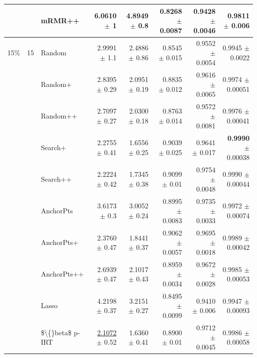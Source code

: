 \begin{longtable}{llp{}rrrrr}
 &  & mRMR++ & 6.0610 {\scriptsize $\pm$ 1} & 4.8949 {\scriptsize $\pm$ 0.8} & 0.8268 {\scriptsize $\pm$ 0.0087} & 0.9428 {\scriptsize $\pm$ 0.0046} & 0.9811 {\scriptsize $\pm$ 0.006} \\
\midrule
15\% & 15 & Random & 2.9991 {\scriptsize $\pm$ 1.1} & 2.4886 {\scriptsize $\pm$ 0.86} & 0.8545 {\scriptsize $\pm$ 0.015} & 0.9552 {\scriptsize $\pm$ 0.0054} & 0.9945 {\scriptsize $\pm$ 0.0022} \\
 &  & Random+ & 2.8395 {\scriptsize $\pm$ 0.29} & 2.0951 {\scriptsize $\pm$ 0.19} & 0.8835 {\scriptsize $\pm$ 0.012} & 0.9616 {\scriptsize $\pm$ 0.0065} & 0.9974 {\scriptsize $\pm$ 0.00051} \\
 &  & Random++ & 2.7097 {\scriptsize $\pm$ 0.27} & 2.0300 {\scriptsize $\pm$ 0.18} & 0.8763 {\scriptsize $\pm$ 0.014} & 0.9572 {\scriptsize $\pm$ 0.0081} & 0.9976 {\scriptsize $\pm$ 0.00041} \\
 &  & Search+ & 2.2755 {\scriptsize $\pm$ 0.41} & 1.6556 {\scriptsize $\pm$ 0.25} & 0.9039 {\scriptsize $\pm$ 0.025} & 0.9641 {\scriptsize $\pm$ 0.017} & \textbf{0.9990} {\scriptsize $\pm$ 0.00038} \\
 &  & Search++ & 2.2224 {\scriptsize $\pm$ 0.42} & 1.7345 {\scriptsize $\pm$ 0.38} & 0.9099 {\scriptsize $\pm$ 0.01} & 0.9754 {\scriptsize $\pm$ 0.0048} & 0.9990 {\scriptsize $\pm$ 0.00044} \\
 &  & AnchorPts & 3.6173 {\scriptsize $\pm$ 0.3} & 3.0052 {\scriptsize $\pm$ 0.24} & 0.8995 {\scriptsize $\pm$ 0.0083} & 0.9735 {\scriptsize $\pm$ 0.0033} & 0.9972 {\scriptsize $\pm$ 0.00074} \\
 &  & AnchorPts+ & 2.3760 {\scriptsize $\pm$ 0.47} & 1.8441 {\scriptsize $\pm$ 0.37} & 0.9062 {\scriptsize $\pm$ 0.0057} & 0.9695 {\scriptsize $\pm$ 0.0018} & 0.9989 {\scriptsize $\pm$ 0.00042} \\
 &  & AnchorPts++ & 2.6939 {\scriptsize $\pm$ 0.47} & 2.1017 {\scriptsize $\pm$ 0.43} & 0.8959 {\scriptsize $\pm$ 0.0034} & 0.9672 {\scriptsize $\pm$ 0.0028} & 0.9985 {\scriptsize $\pm$ 0.00053} \\
 &  & Lasso & 4.2198 {\scriptsize $\pm$ 0.37} & 3.2151 {\scriptsize $\pm$ 0.27} & 0.8495 {\scriptsize $\pm$ 0.0099} & 0.9410 {\scriptsize $\pm$ 0.006} & 0.9947 {\scriptsize $\pm$ 0.00093} \\
 &  & \$\textbackslash\{\}beta\$ p-IRT & \underline{2.1072} {\scriptsize $\pm$ 0.52} & 1.6360 {\scriptsize $\pm$ 0.41} & 0.8900 {\scriptsize $\pm$ 0.01} & 0.9712 {\scriptsize $\pm$ 0.0045} & 0.9986 {\scriptsize $\pm$ 0.00058} \\

\end{longtable}

